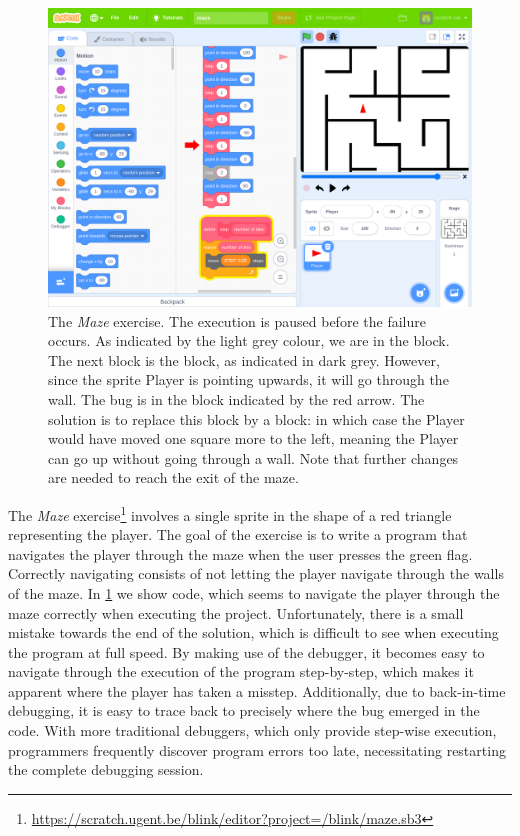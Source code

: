 \documentclass[../main]{subfiles}
\begin{document}
\begin{figure}
    \begin{wide}
        \includegraphics[width=\linewidth]{maze}
    \end{wide}
    \caption[The Maze exercise.]{
        The \emph{Maze} exercise.
        The execution is paused before the failure occurs.
        As indicated by the light grey colour, we are in the  block.
        The next block is the  block, as indicated in dark grey.
        However, since the sprite Player is pointing upwards, it will go through the wall.
        The bug is in the  block indicated by the red arrow.
        The solution is to replace this block by a  block: in which case the Player would have moved one square more to the left, meaning the Player can go up without going through a wall.
        Note that further changes are needed to reach the exit of the maze.
    }
    \label{fig:maze}
\end{figure}

The \emph{Maze} exercise\footnote{\url{https://scratch.ugent.be/blink/editor?project=/blink/maze.sb3}} involves a single sprite in the shape of a red triangle representing the player.
The goal of the exercise is to write a program that navigates the player through the maze when the user presses the green flag.
Correctly navigating consists of not letting the player navigate through the walls of the maze.
In \cref{fig:maze} we show code, which seems to navigate the player through the maze correctly when executing the project.
Unfortunately, there is a small mistake towards the end of the solution, which is difficult to see when executing the program at full speed.
By making use of the debugger, it becomes easy to navigate through the execution of the program step-by-step, which makes it apparent where the player has taken a misstep.
Additionally, due to back-in-time debugging, it is easy to trace back to precisely where the bug emerged in the code.
With more traditional debuggers, which only provide step-wise execution, programmers frequently discover program errors too late, necessitating restarting the complete debugging session.
\end{document}
